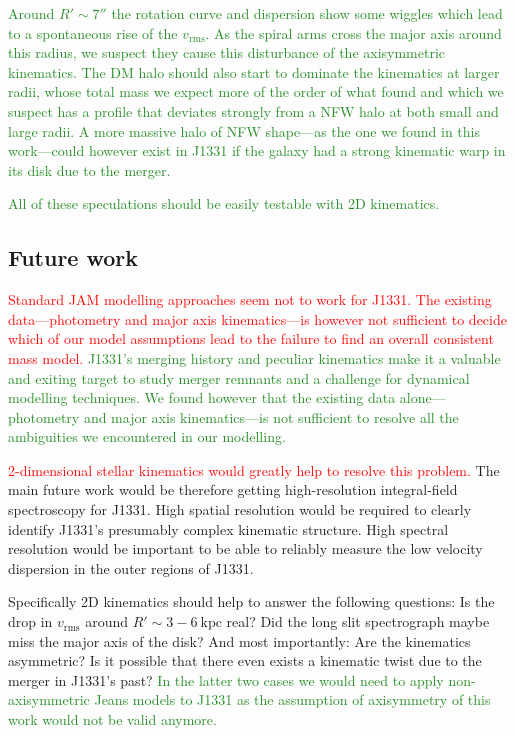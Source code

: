 \documentclass[useAMS,usenatbib]{mnras}
\newcommand{\NEW}[1]{\textcolor{ForestGreen}{#1}}
\newcommand{\OLD}[1]{\textcolor{Red}{#1}}
\begin{document}
\NEW{Around $R'\sim7''$ the rotation curve and dispersion show some wiggles which lead to a spontaneous rise of the $v_\text{rms}$. As the spiral arms cross the major axis around this radius, we suspect they cause this disturbance of the axisymmetric kinematics. The DM halo should also start to dominate the kinematics at larger radii, whose total mass we expect more of the order of what \citet{SWELLSV} found and which we suspect has a profile that deviates strongly from a NFW halo at both small and large radii. A more massive halo of NFW shape---as the one we found in this work---could however exist in J1331 if the galaxy had a strong kinematic warp in its disk due to the merger.}

\NEW{All of these speculations should be easily testable with 2D kinematics.}

\subsection{Future work}

\OLD{Standard JAM modelling approaches seem not to work for J1331. The existing data---photometry and major axis kinematics---is however not sufficient to decide which of our model assumptions lead to the failure to find an overall consistent mass model.}
\NEW{J1331's merging history and peculiar kinematics make it a valuable and exiting target to study merger remnants and a challenge for dynamical modelling techniques. We found however that the existing data alone---photometry and major axis kinematics---is not sufficient to resolve all the ambiguities we encountered in our modelling.}

\OLD{2-dimensional stellar kinematics would greatly help to resolve this problem. }The main future work would be therefore getting high-resolution integral-field spectroscopy for J1331. High spatial resolution would be required to clearly identify J1331's presumably complex kinematic structure. High spectral resolution would be important to be able to reliably measure the low velocity dispersion in the outer regions of J1331.

Specifically 2D kinematics should help to answer the following questions: Is the drop in $v_\text{rms}$ around $R' \sim 3-6~\text{kpc}$ real? Did the long slit spectrograph maybe miss the major axis of the disk? And most importantly: Are the kinematics asymmetric? Is it possible that there even exists a kinematic twist due to the merger in J1331's past? \NEW{In the latter two cases we would need to apply non-axisymmetric Jeans models to J1331 as the assumption of axisymmetry of this work would not be valid anymore.}
\end{document}
